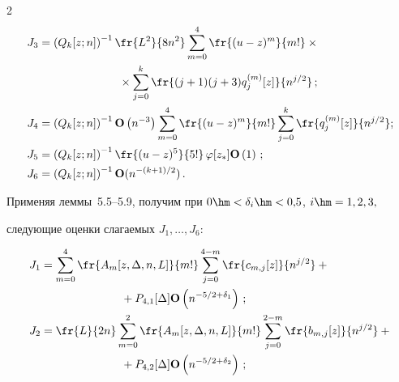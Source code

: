 \begin{multicols}{2}
\begin{align*}
 J_3&=\left(Q_k[z;n]\right)^{-1}\fr{L^2}{8n^2}\sum\limits_{m=0}^4 \fr{(u-z)^m}{m!}\times{}\\


 &\hspace*{25mm}{}\times\sum\limits_{j=0}^k \fr{(j+1)(j+3)q_j^{(m)}[z]}{n^{j/2}}\,;


\\


 J_4&=\left(Q_k[z;n]\right)^{-1}\Op\left(n^{-3}\right)\sum_{m=0}^4 \fr{(u-z)^m}{m!}\sum\limits_{j=0}^k \fr{q_j^{(m)}[z]}{n^{j/2}};


\\


 J_5&=  \left(Q_k[z;n]\right)^{-1}\fr{(u-z)^5}{5!}\, \varphi[z_*]\Op\left(1\right)\,;\\  


 J_6&=\left(Q_k[z;n]\right)^{-1}\Op(n^{-(k+1)/2})\,.


 \end{align*}





 Применяя леммы~5.5--5.9, получим при $0\hm<\delta_i\hm<0{,}5$, $i\hm=1,2,3,$ 


 следующие оценки слагаемых $J_1,\ldots,J_6$:





 \noindent


 \begin{align}


 J_1&=\sum\limits_{m=0}^4  \fr{A_m[z,\Delta,n,L]}{m!} \sum\limits_{j=0}^{4-m}


  \fr{c_{m,j}[z]}{n^{j/2}}+{}\notag\\


  &\hspace*{25mm}{}+P_{4,1}[\Delta]\Op\left(n^{-5/2+\delta_1}\right)\,;


 \label{T:6.1-6}\\


 J_2&=\fr{L}{2n} \sum\limits_{m=0}^2 \fr{A_m[z,\Delta,n,L]}{m!}


 \sum\limits_{j=0}^{2-m} \fr{b_{m,j}[z]}{n^{j/2}}


 +{}\notag\\


 &\hspace*{25mm}{}+P_{4,2}[\Delta]\Op\left(n^{-5/2+\delta_2}\right)\,;


 \label{T:6.1-7}\\



\end{align}
\end{multicols}
